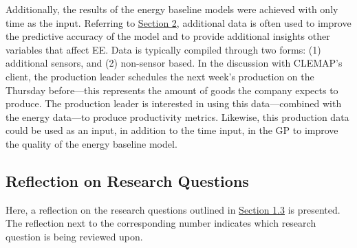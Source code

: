Additionally, the results of the energy baseline models were achieved with only time as the input. Referring to \hyperlink{section.2}{Section 2}, additional data is often used to improve the predictive accuracy of the model and to provide additional insights other variables that affect EE. Data is typically compiled through two forms: (1) additional sensors, and (2) non-sensor based. In the discussion with CLEMAP's client, the production leader schedules the next week's production on the Thursday before—this represents the amount of goods the company expects to produce. The production leader is interested in using this data—combined with the energy data—to produce productivity metrics. Likewise, this production data could be used as an input, in addition to the time input, in the GP to improve the quality of the energy baseline model.

\subsection{Reflection on Research Questions}

Here, a reflection on the research questions outlined in \hyperlink{subsection.1.3}{Section 1.3} is presented. The reflection next to the corresponding number indicates which research question is being reviewed upon.

